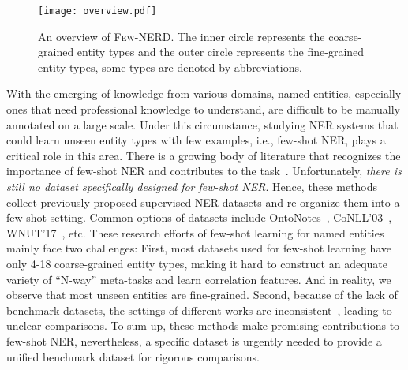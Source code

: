 \documentclass[11pt,a4paper, dvipsnames]{article}
\begin{document}
\begin{figure}[t]
    \centering
    \texttt{[image: overview.pdf]}
    \caption{An overview of \textsc{Few-NERD}. The inner circle represents the coarse-grained entity types and the outer circle represents the fine-grained entity types, some types are denoted by abbreviations.}
    \label{fig:overview}
\end{figure}

With the emerging of knowledge from various domains, named entities, especially ones that need professional knowledge to understand, are difficult to be manually annotated on a large scale.
Under this circumstance, studying NER systems that could learn unseen entity types with few examples, i.e., few-shot NER, plays a critical role in this area. There is a growing body of literature that recognizes the importance of few-shot NER and contributes to the task~\cite{hofer2018few, fritzler2019few, yang2020simple, li2020few, huang2020few}. Unfortunately, \textit{there is still no dataset specifically designed for few-shot NER}. Hence, these methods collect previously proposed supervised NER datasets and re-organize them into a few-shot setting. Common options of datasets include OntoNotes~\cite{weischedel2013ontonotes}, CoNLL'03~\cite{sang2003introduction}, WNUT'17~\cite{derczynski2017results}, etc. 
These research efforts of few-shot learning for named entities mainly face two challenges:
First, most datasets used for few-shot learning have only 4-18 coarse-grained entity types, making it hard to construct an adequate variety of ``N-way'' meta-tasks and learn correlation features. And in reality, we observe that most unseen entities are fine-grained. Second, because of the lack of benchmark datasets, the settings of different works are inconsistent~\cite{huang2020few,yang2020simple}, leading to unclear comparisons. 
To sum up, these methods make promising contributions to few-shot NER, nevertheless, a specific dataset is urgently needed to provide a unified benchmark dataset for rigorous comparisons. 
\end{document}
